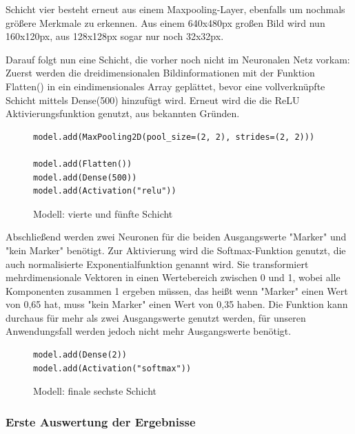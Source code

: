 \documentclass[conference]{IEEEtran}
\begin{document}
	
	Schicht vier besteht erneut aus einem Maxpooling-Layer, ebenfalls um nochmals größere Merkmale zu erkennen.
	Aus einem 640x480px großen Bild wird nun 160x120px, aus 128x128px sogar nur noch 32x32px.
	
	Darauf folgt nun eine Schicht, die vorher noch nicht im Neuronalen Netz vorkam:
	Zuerst werden die dreidimensionalen Bildinformationen mit der Funktion 
	Flatten() in ein eindimensionales Array geplättet, bevor  eine 
	vollverknüpfte Schicht mittels Dense(500) hinzufügt wird.
	Erneut wird die  die ReLU Aktivierungsfunktion genutzt, aus bekannten 
	Gründen.
	
	\begin{figure}[!h]
		\centering
		\begin{verbatim}
model.add(MaxPooling2D(pool_size=(2, 2), strides=(2, 2)))

model.add(Flatten())
model.add(Dense(500))
model.add(Activation("relu"))
		\end{verbatim}
		\caption{Modell: vierte und fünfte Schicht}
		\label{Schicht vier und fünf}
	\end{figure}
	
	Abschließend werden zwei Neuronen für die beiden Ausgangswerte 
	"Marker" und "kein Marker" benötigt.
	Zur Aktivierung wird die Softmax-Funktion genutzt, die auch 
	normalisierte Exponentialfunktion genannt wird.
	Sie transformiert mehrdimensionale Vektoren in einen Wertebereich zwischen 0 und 1, wobei alle Komponenten zusammen 1 ergeben müssen, das heißt wenn "Marker" einen Wert von 0,65 hat, muss "kein Marker" einen Wert von 0,35 haben. 
	Die Funktion kann durchaus für mehr als zwei Ausgangswerte genutzt werden, für unseren Anwendungsfall werden jedoch nicht mehr Ausgangswerte benötigt.
	
	\begin{figure}[!h]
		\centering
		\begin{verbatim}
model.add(Dense(2))
model.add(Activation("softmax"))
		\end{verbatim}
		\caption{Modell: finale sechste Schicht}
		\label{Schicht sechs}
	\end{figure}

	\subsubsection{Erste Auswertung der Ergebnisse}	%
\end{document}
